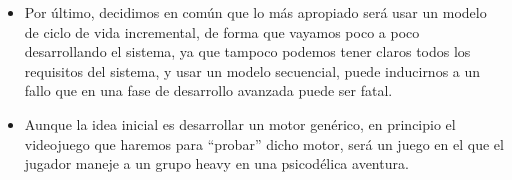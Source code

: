 \documentclass[a4paper,10pt]{article}
\begin{document}
\begin{itemize}
\item Por último, decidimos en común que lo más apropiado será usar un
  modelo de ciclo de vida incremental, de forma que vayamos poco a
  poco desarrollando el sistema, ya que tampoco podemos tener claros
  todos los requisitos del sistema, y usar un modelo secuencial, puede
  inducirnos a un fallo que en una fase de desarrollo avanzada puede
  ser fatal.
  
\item Aunque la idea inicial es desarrollar un motor genérico, en
  principio el videojuego que haremos para ``probar'' dicho motor,
  será un juego en el que el jugador maneje a un grupo heavy en una
  psicodélica aventura.
\end{itemize}
\end{document}
